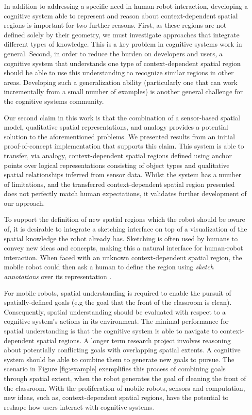 \documentclass[letterpaper]{article}
\begin{document}
In addition to addressing a specific need in human-robot interaction, developing a cognitive system able to represent and reason about context-dependent spatial regions is important for two further reasons. First, as these regions are not defined solely by their geometry, we must investigate approaches that integrate different types of knowledge. This is a key problem in cognitive systems work in general. Second, in order to reduce the burden on developers and users, a cognitive system that understands one type of context-dependent spatial region should be able to use this understanding to recognize similar regions in other areas. Developing such a generalization ability (particularly one that can work incrementally from a small number of examples) is another general challenge for the cognitive systems community.

Our second claim in this work is that the combination of a sensor-based spatial model, qualitative spatial representations, and analogy provides a potential solution to the aforementioned problems. We presented results from an initial proof-of-concept implementation that supports this claim. This system is able to transfer, via analogy, context-dependent spatial regions defined using anchor points over logical representations consisting of  object types and qualitative spatial relationships inferred from sensor data. Whilst the system has a number of limitations, and the transferred context-dependent spatial region presented does not perfectly match human expectations, it validates further development of our approach. 

To support the definition of new spatial regions which the robot should be aware of, it is desirable to integrate a sketching interface on top of a visualization of the spatial knowledge the robot already has. Sketching \cite{Forbus/etal:2009a} is often used by humans to convey new ideas and concepts, making this a natural interface for human-robot interaction. When faced with an unknown context-dependent spatial region, the mobile robot could then ask a human to define the region using \textit{sketch annotations} over its representation \cite{Klenk/etal2005}. 

For mobile robots, spatial understanding is required to enable the pursuit of spatially-defined goals (e.g the goal that the front of the classroom is clean). Consequently, spatial understanding should be evaluated with respect to a cognitive system's actions in its environment. The minimal performance for spatial understanding is that the cognitive system is able to navigate to context-dependent spatial regions. A longer term research project involves reasoning about potentially conflicting goals with overlapping spatial extents. A cognitive system should be able to combine them to generate new goals to pursue. The scenario in Figure \ref{fig:example} exemplifies this process of combining goals through spatial extent, when the robot generates the goal of cleaning the front of the classroom. With the proliferation of mobile robots, sensors and computation, new ideas, such as, context-dependent spatial regions, have the potential to reshape how users interact with cognitive systems.
\end{document}
